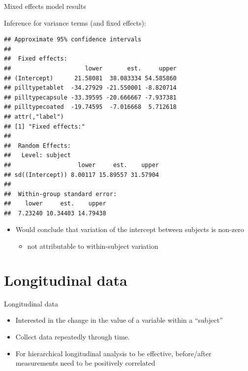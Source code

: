 \documentclass[
  ignorenonframetext,
]{beamer}
\providecommand{\tightlist}{%
  \setlength{\itemsep}{0pt}\setlength{\parskip}{0pt}}
\begin{document}
\begin{frame}[fragile]{Mixed effects model results}
\protect\hypertarget{mixed-effects-model-results-2}{}

Inference for variance terms (and fixed effects): \tiny

\begin{verbatim}
## Approximate 95% confidence intervals
## 
##  Fixed effects:
##                     lower       est.     upper
## (Intercept)      21.58081  38.083334 54.585860
## pilltypetablet  -34.27929 -21.550001 -8.820714
## pilltypecapsule -33.39595 -20.666667 -7.937381
## pilltypecoated  -19.74595  -7.016668  5.712618
## attr(,"label")
## [1] "Fixed effects:"
## 
##  Random Effects:
##   Level: subject 
##                   lower     est.    upper
## sd((Intercept)) 8.00117 15.89557 31.57904
## 
##  Within-group standard error:
##    lower     est.    upper 
##  7.23240 10.34403 14.79438
\end{verbatim}

\normalsize

\begin{itemize}
\tightlist
\item
  Would conclude that variation of the intercept between subjects is
  non-zero

  \begin{itemize}
  \tightlist
  \item
    not attributable to within-subject variation
  \end{itemize}
\end{itemize}

\end{frame}

\hypertarget{longitudinal-data}{%
\section{Longitudinal data}\label{longitudinal-data}}

\begin{frame}{Longitudinal data}
\protect\hypertarget{longitudinal-data-1}{}

\begin{itemize}
\tightlist
\item
  Interested in the change in the value of a variable within a
  ``subject''
\item
  Collect data repeatedly through time.
\item
  For hierarchical longitudinal analysis to be effective, before/after
  measurements need to be positively correlated
\end{itemize}

\end{frame}
\end{document}

